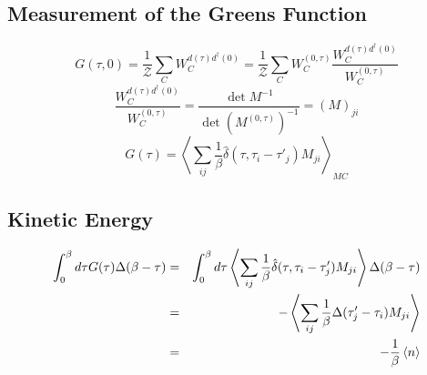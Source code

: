 \documentclass[a4paper]{article}
\begin{document}
\subsection{Measurement of the Greens Function} %
\label{sub:Measurement of the Greens Function}
\begin{equation}
    G(\tau,0)
        = \frac{1}{\mathcal{Z}} \sum_{C} W_{C}^{d(\tau)d^{\dagger}(0)}
        = \frac{1}{\mathcal{Z}} \sum_{C} W_{C}^{(0,\tau)}
            \frac{W_{C}^{d(\tau)d^{\dagger}(0)}}{W_{C}^{(0,\tau)}}
\end{equation}
\begin{equation}
    \frac{W_{C}^{d(\tau)d^{\dagger}(0)}}{W_{C}^{(0,\tau)}}
        = \frac{\det M^{-1}}{\det(M^{(0,\tau)})^{-1}}
        = (M)_{ji}
\end{equation}
\begin{equation}
    G(\tau) = 
        \left\langle \sum_{ij}\frac{1}{\beta}
        \hat{\delta}(\tau, \tau_i - \tau'_j) M_{ji}\right\rangle_{MC}
\end{equation}

\subsection{Kinetic Energy} %
\label{sub:Kinetic Energy}
\begin{eqnarray}
    \int_{0}^{\beta} d\tau G(\tau) \Delta(\beta-\tau)
        &=& \int_{0}^{\beta} d\tau 
            \left\langle \sum_{ij}\frac{1}{\beta}
            \hat{\delta}(\tau, \tau_i - \tau'_j) M_{ji}\right\rangle
            \Delta(\beta-\tau) \\
        &=& -\left\langle \sum_{ij}\frac{1}{\beta}
            \Delta(\tau'_j - \tau_i) M_{ji}\right\rangle \\
        &=& -\frac{1}{\beta} \braket{n}
\end{eqnarray}

\end{document}
